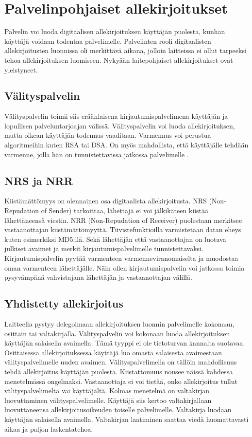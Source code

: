 \documentclass[finnish]{tktltiki2}
\theoremstyle{definition}
\theoremstyle{remark}
\begin{document}
\section{Palvelinpohjaiset allekirjoitukset}

Palvelin voi luoda digitaalisen allekirjoituksen käyttäjän puolesta, kunhan käyttäjä voidaan todentaa palvelimelle. Palvelinten rooli digitaalisten allekirjoitusten luonnissa oli merkittävä aikana, jolloin laitteissa ei ollut tarpeeksi tehoa allekirjoituksen luomiseen. Nykyään laitepohjaiset allekirjoitukset ovat yleistyneet. \cite{proxy}

\subsection{Välityspalvelin}

Välityspalvelin toimii siis eräänlaisena kirjautumispalvelimena käyttäjän ja lopullisen palveluntarjoajan välissä. Välityspalvelin voi luoda allekirjoituksen, mutta oikean käyttäjän todennus vaaditaan. Varmennus voi perustua algoritmeihin kuten RSA tai DSA. On myös mahdollista, että käyttäjälle tehdään varmenne, jolla hän on tunnistettavissa jatkossa palvelimelle \cite{proxy}.

\subsection{NRS ja NRR}

Kiistämättömyys on olennainen osa digitaalista allekirjoitusta. NRS (Non-Repudation of Sender) tarkoittaa, lähettäjä ei voi jälkikäteen kiistää lähettäneensä viestin. NRR (Non-Repudation of Receiver) puolestaan merkitsee vastaanottajan kiistämättömyyttä. Tiivistefunktioilla varmistetaan datan eheys kuten esimerkiksi MD5:llä. Sekä lähettäjän että vastaanottajan on luotava julkiset avaimet ja merkit kirjautumispalvelimelle tunnistettavaksi. Kirjautumispalvelin pyytää varmenteen varmenneviranomaiselta ja muodostaa oman varmenteen lähettäjälle. Näin ollen kirjautumispalvelin voi jatkossa toimia pysyvämpänä vahvistajana lähettäjän ja vastaanottajan välillä. \cite{gene}

\subsection{Yhdistetty allekirjoitus}

Laitteella pystyy delegoimaan allekirjoituksen luonnin palvelimelle kokonaan, osittain tai valtakirjalla. Välityspalvelin voi kokonaan luoda allekirjoituksen käyttäjän salaisella avaimella. Tämä tyyppi ei ole tietoturvan kannalta suotavaa. Osittaisessa allekirjoituksessa käyttäjä luo omasta salaisesta avaimestaan välityspalvelimelle uuden avaimen. Välityspalvelimella on tällöin mahdollisuus tehdä allekirjoitus käyttäjän puolesta. Kiistattomuus nousee näissä kahdessa menetelmässä ongelmaksi. Vastaanottaja ei voi tietää, onko allekirjoitus tullut välityspalvelimelta vai käyttäjältä. Kolmas menetelmä on valtakirjan luovuttaminen välityspalvelimelle. Käyttäjä siis kertoo valtakirjallaan luovuttaneensa allekirjoitusoikeuden toiselle palvelimelle. Valtakirja luodaan käyttäjän salaisella avaimella. Valtakirjan laatiminen saattaa viedä huomattavasti aikaa ja paljon laskentatehoa. \cite{joint}
\end{document}

